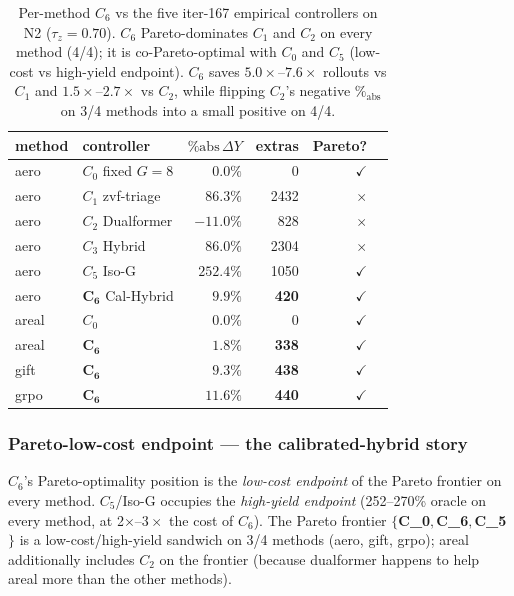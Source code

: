 \begin{table}[ht]
\centering
\small
\begin{tabular}{llrrrr}
\toprule
method & controller & $\%\mathrm{abs}\,\Delta Y$ & extras & Pareto? \\
\midrule
aero   & $C_0$ fixed $G{=}8$        & $0.0\%$         & 0     & $\checkmark$ \\
aero   & $C_1$ zvf-triage           & $86.3\%$        & 2432  & $\times$ \\
aero   & $C_2$ Dualformer           & $-11.0\%$       & 828   & $\times$ \\
aero   & $C_3$ Hybrid               & $86.0\%$        & 2304  & $\times$ \\
aero   & $C_5$ Iso-G                & $252.4\%$       & 1050  & $\checkmark$ \\
aero   & $\mathbf{C_6}$ Cal-Hybrid  & $\mathbf{9.9\%}$  & \textbf{420}   & $\checkmark$ \\
\midrule
areal  & $C_0$                      & $0.0\%$         & 0     & $\checkmark$ \\
areal  & $\mathbf{C_6}$             & $\mathbf{1.8\%}$  & \textbf{338}   & $\checkmark$ \\
\midrule
gift   & $\mathbf{C_6}$             & $\mathbf{9.3\%}$  & \textbf{438}   & $\checkmark$ \\
\midrule
grpo   & $\mathbf{C_6}$             & $\mathbf{11.6\%}$ & \textbf{440}   & $\checkmark$ \\
\bottomrule
\end{tabular}
\caption{Per-method $C_6$ vs the five iter-167 empirical controllers
on N2 ($\tau_z = 0.70$). $C_6$ Pareto-dominates $C_1$ and $C_2$ on every
method (4/4); it is co-Pareto-optimal with $C_0$ and $C_5$ (low-cost
vs high-yield endpoint). $C_6$ saves $5.0\times$--$7.6\times$ rollouts
vs $C_1$ and $1.5\times$--$2.7\times$ vs $C_2$, while flipping
$C_2$'s negative $\%_{\mathrm{abs}}$ on 3/4 methods into a small
positive on 4/4.}
\label{tab:p7-iter175-c6-summary}
\end{table}

\subsubsection*{Pareto-low-cost endpoint --- the calibrated-hybrid story}

$C_6$'s Pareto-optimality position is the \emph{low-cost endpoint} of
the Pareto frontier on every method. $C_5$/Iso-G occupies the
\emph{high-yield endpoint} (252--270\% oracle on every method, at
2$\times$--$3\times$ the cost of $C_6$). The Pareto frontier
{\bf $\{$C_0$, $C_6$, $C_5$\}$} is a low-cost/high-yield sandwich on
3/4 methods (aero, gift, grpo); areal additionally includes $C_2$ on
the frontier (because dualformer happens to help areal more than the
other methods).

